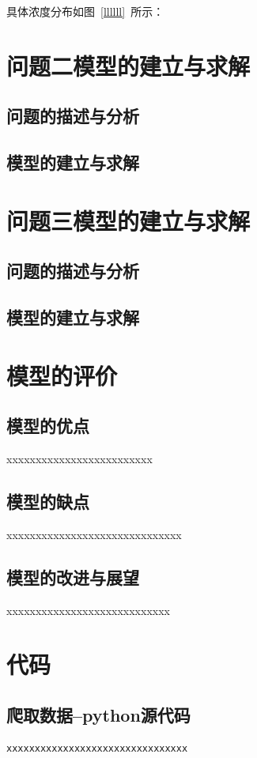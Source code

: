 \documentclass{whutmod}
\begin{document}
具体浓度分布如图~\ref{llllll}~所示：


	\section{问题二模型的建立与求解}
	\subsection{问题的描述与分析}
	\subsection{模型的建立与求解}
	

	\section{问题三模型的建立与求解}
	
	
	\subsection{问题的描述与分析}

	\subsection{模型的建立与求解}


	\section{模型的评价}
	\subsection{模型的优点}
xxxxxxxxxxxxxxxxxxxxxxxxx
	
	\subsection{模型的缺点}
xxxxxxxxxxxxxxxxxxxxxxxxxxxxxx


	\subsection{模型的改进与展望}%
xxxxxxxxxxxxxxxxxxxxxxxxxxxx
	\newpage	%
	\nocite{*}		%
	\printbibliography[title = {参考文献}]	%
	
	\newpage
	\appendix %
\section{代码}
\subsection{爬取数据--python源代码}
\begin{lstlisting}[language=python]%这里修改语言
xxxxxxxxxxxxxxxxxxxxxxxxxxxxxxxx
\end{lstlisting}
\end{document}
